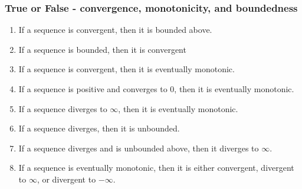 \documentclass[14pt]{beamer}
\begin{document}
\begin{frame}[t]
	\fontsize{13}{13}\selectfont
	\frametitle{\fontsize{13}{13}\selectfont True or False - convergence,
	monotonicity, and boundedness}

	\begin{enumerate}
		\item If a sequence is convergent, then it is bounded above.

		\item If a sequence is bounded, then it is convergent

		\item If a sequence is convergent, then it is eventually monotonic.

		\item If a sequence is positive and converges to 0, then it is eventually
			monotonic.

		\item If a sequence diverges to $\infty$, then it is eventually monotonic.

		\item If a sequence diverges, then it is unbounded.

		\item If a sequence diverges and is unbounded above, then it diverges to
			$\infty$.

		\item If a sequence is eventually monotonic, then it is either convergent, divergent
			to $\infty$, or divergent to $-\infty$.
	\end{enumerate}
\end{frame}
\end{document}
